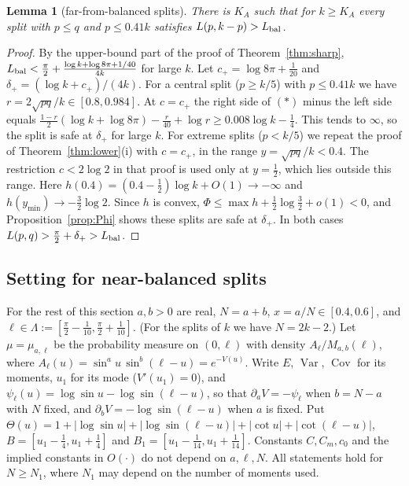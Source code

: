 \documentclass[11pt]{amsart}
\newtheorem{lemma}[theorem]{Lemma}
\theoremstyle{definition}
\begin{document}
\begin{lemma}[far-from-balanced splits]\label{lem:outer}
There is $K_A$ such that for $k\ge K_A$ every split with $p\le q$ and $p\le0.41k$ satisfies $L(p,k-p)>L_{\rm bal}$.
\end{lemma}
\begin{proof}
By the upper-bound part of the proof of Theorem~\ref{thm:sharp}, $L_{\rm bal}<\frac\pi2+\frac{\log k+\log8\pi+1/40}{4k}$ for large $k$. Let
$c_+=\log8\pi+\frac1{20}$ and $\delta_+=(\log k+c_+)/(4k)$. For a central split ($p\ge k/5$) with $p\le0.41k$ we have $r=2\sqrt{pq}/k\in[0.8,0.984]$. At $c=c_+$ the right side of
$(\ast)$ minus the left side equals $\frac{1-r}2(\log k+\log8\pi)-\frac r{40}+\log r\ge0.008\log k-\frac14$. This tends to $\infty$, so the split is safe at $\delta_+$ for large $k$. For
extreme splits ($p<k/5$) we repeat the proof of Theorem~\ref{thm:lower}(i) with $c=c_+$, in the range $y=\sqrt{pq}/k<0.4$. The restriction $c<2\log2$ in that proof is used
only at $y=\frac12$, which lies outside this range. Here $h(0.4)=(0.4-\frac12)\log k+O(1)\to-\infty$ and $h(y_{\min})\to-\frac32\log2$. Since $h$ is convex, $\Phi\le\max h+\frac12\log\frac32+o(1)<0$, and
Proposition~\ref{prop:Phi} shows these splits are safe at $\delta_+$. In both cases $L(p,q)>\frac\pi2+\delta_+>L_{\rm bal}$.
\end{proof}

\subsection*{Setting for near-balanced splits}
For the rest of this section $a,b>0$ are real, $N=a+b$, $x=a/N\in[0.4,0.6]$, and $\ell\in\Lambda:=[\frac\pi2-\frac1{10},\frac\pi2+\frac1{10}]$.
(For the splits of $k$ we have $N=2k-2$.)
Let $\mu=\mu_{a,\ell}$ be the probability measure on $(0,\ell)$ with density $A_\ell/M_{a,b}(\ell)$, where $A_\ell(u)=\sin^au\,\sin^b(\ell-u)=e^{-V(u)}$. Write $E$, $\operatorname{Var}$, $\operatorname{Cov}$ for its
moments, $u_1$ for its mode ($V'(u_1)=0$), and $\psi_\ell(u)=\log\sin u-\log\sin(\ell-u)$, so that $\partial_aV=-\psi_\ell$ when $b=N-a$ with $N$ fixed,
and $\partial_bV=-\log\sin(\ell-u)$ when $a$ is fixed. Put
$\Theta(u)=1+|\log\sin u|+|\log\sin(\ell-u)|+|\cot u|+|\cot(\ell-u)|$, $B=[u_1-\frac14,u_1+\frac14]$ and $B_1=[u_1-\frac1{14},u_1+\frac1{14}]$.
Constants $C,C_m,c_0$ and the implied constants in $O(\cdot)$ do not depend on $a,\ell,N$. All statements hold for $N\ge N_1$, where $N_1$ may depend on the
number of moments used.
\end{document}
